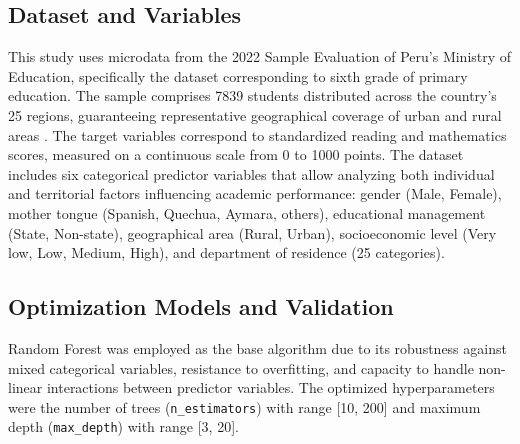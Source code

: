 \documentclass[conference]{IEEEtran}
\begin{document}
\subsection{Dataset and Variables}
This study uses microdata from the 2022 Sample Evaluation of Peru's Ministry of Education, specifically the dataset corresponding to sixth grade of primary education. The sample comprises 7839 students distributed across the country's 25 regions, guaranteeing representative geographical coverage of urban and rural areas \cite{minedu2022em}. The target variables correspond to standardized reading and mathematics scores, measured on a continuous scale from 0 to 1000 points. The dataset includes six categorical predictor variables that allow analyzing both individual and territorial factors influencing academic performance: gender (Male, Female), mother tongue (Spanish, Quechua, Aymara, others), educational management (State, Non-state), geographical area (Rural, Urban), socioeconomic level (Very low, Low, Medium, High), and department of residence (25 categories).

\begin{table}[htbp]
\caption{Dataset variables}
\label{tab:variables}
\end{table}

\subsection{Optimization Models and Validation}
Random Forest was employed as the base algorithm due to its robustness against mixed categorical variables, resistance to overfitting, and capacity to handle non-linear interactions between predictor variables. The optimized hyperparameters were the number of trees (\texttt{n\_estimators}) with range [10, 200] and maximum depth (\texttt{max\_depth}) with range [3, 20].
\end{document}
